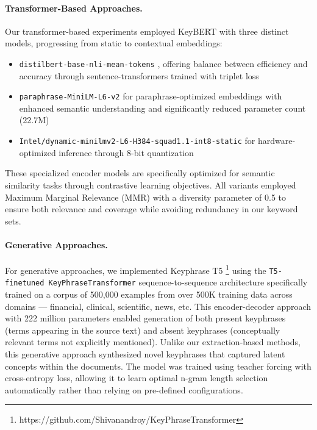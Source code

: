 \documentclass[sigconf]{acmart}
\begin{document}
\paragraph{Transformer-Based Approaches.}
Our transformer-based experiments employed KeyBERT \cite{grootendorst2020keybert} with three distinct models, progressing from static to contextual embeddings:
\begin{itemize}
    \item \texttt{distilbert-base-nli-mean-tokens} \cite{DBLP:journals/corr/abs-1910-01108}, offering balance between efficiency and accuracy through sentence-transformers trained with triplet loss
    \item \texttt{paraphrase-MiniLM-L6-v2} \cite{DBLP:conf/acl/WangBHDW21} for paraphrase-optimized embeddings with enhanced semantic understanding and significantly reduced parameter count (22.7M)
    \item \texttt{Intel/dynamic-minilmv2-L6-H384-squad1.1-int8-static} \cite{DBLP:journals/corr/abs-2210-17114} for hardware-optimized inference through 8-bit quantization
\end{itemize}

These specialized encoder models are specifically optimized for semantic similarity tasks through contrastive learning objectives. All variants employed Maximum Marginal Relevance (MMR) \cite{DBLP:conf/sigir/CarbonellG98} with a diversity parameter of 0.5 to ensure both relevance and coverage while avoiding redundancy in our keyword sets.

\paragraph{Generative Approaches.}
For generative approaches, we implemented Keyphrase T5 \footnote{https://github.com/Shivanandroy/KeyPhraseTransformer} using the \texttt{T5-finetuned KeyPhraseTransformer} sequence-to-sequence architecture \cite{DBLP:journals/jmlr/RaffelSRLNMZLL20} specifically trained on a corpus of 500,000 examples from over 500K training data across domains — financial, clinical, scientific, news, etc. This encoder-decoder approach with 222 million parameters enabled generation of both present keyphrases (terms appearing in the source text) and absent keyphrases (conceptually relevant terms not explicitly mentioned). Unlike our extraction-based methods, this generative approach synthesized novel keyphrases that captured latent concepts within the documents. The model was trained using teacher forcing with cross-entropy loss, allowing it to learn optimal n-gram length selection automatically rather than relying on pre-defined configurations.
\end{document}
